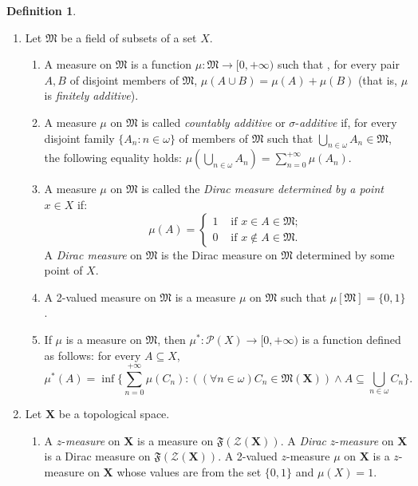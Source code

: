 \documentclass[12pt,twoside,leqno]{article}
\theoremstyle{plain}
\theoremstyle{definition}
\newtheorem{definition}[theorem]{Definition}
\theoremstyle{remark}
\begin{document}
\begin{definition}
	\label{s8:d2}
	\begin{enumerate}
		\item[(a)] Let $\mathfrak{M}$ be a field of subsets of a set $X$. 
		\begin{enumerate}
			\item[(i)] A measure on $\mathfrak{M}$ is a function $\mu: \mathfrak{M}\to [0, +\infty)$  such that , for every pair $A,B$ of disjoint members of $\mathfrak{M}$, $\mu(A\cup B)=\mu(A)+\mu(B)$ (that is, $\mu$ is \emph{finitely additive}).
			\item[(ii)] A measure $\mu$ on $\mathfrak{M}$ is called \emph{countably additive} or $\sigma$-\emph{additive} if, for every disjoint family $\{A_n: n\in\omega\}$ of members of $\mathfrak{M}$ such that $\bigcup\limits_{n\in\omega}A_n\in\mathfrak{M}$, the following equality holds: $\mu(\bigcup\limits_{n\in\omega}A_n)=\sum\limits_{n=0}^{+\infty}\mu(A_n)$. 
			\item[(iii)] A measure $\mu$ on $\mathfrak{M}$ is called the \emph{Dirac measure determined by a point} $x\in X$ if:
			$$
			\mu(A)=\begin{cases} 1 &\text{ if } x\in A\in\mathfrak{M};\\
				0 & \text{ if } x\notin A\in\mathfrak{M}.\end{cases}
			$$
			A \emph{Dirac measure} on $\mathfrak{M}$ is the Dirac measure on $\mathfrak{M}$ determined by some point of $X$. 
			\item[(iv)] A 2-valued measure on $\mathfrak{M}$ is a measure $\mu$ on $\mathfrak{M}$ such that $\mu[\mathfrak{M}]=\{0, 1\}$. 
			\item[(v)] If $\mu$ is a measure on $\mathfrak{M}$, then $\mu^{\ast}:\mathcal{P}(X)\to [0,+\infty)$ is a function defined as follows:  for every $A\subseteq X$, 
			$$\mu^{\ast}(A)=\inf\{\sum\limits_{n=0}^{+\infty}\mu(C_n): ((\forall n\in\omega)C_n\in\mathfrak{M}(\mathbf{X}))\wedge A\subseteq\bigcup\limits_{n\in\omega}C_n\}.$$
		\end{enumerate}
		\item[(b)] Let $\mathbf{X}$ be a topological space. 
		\begin{enumerate}
			\item[(vi)] A $z$-\emph{measure} on $\mathbf{X}$ is a measure on $\mathfrak{F}(\mathcal{Z}(\mathbf{X}))$. A \emph{Dirac} $z$-\emph{measure} on $\mathbf{X}$ is a Dirac measure on $\mathfrak{F}(\mathcal{Z}(\mathbf{X}))$. A 2-valued $z$-measure $\mu$ on $\mathbf{X}$ is a $z$-measure on $\mathbf{X}$ whose values are from the set $\{0, 1\}$ and $\mu(X)=1$. 

\end{enumerate}
\end{enumerate}
\end{definition}
\end{document}
